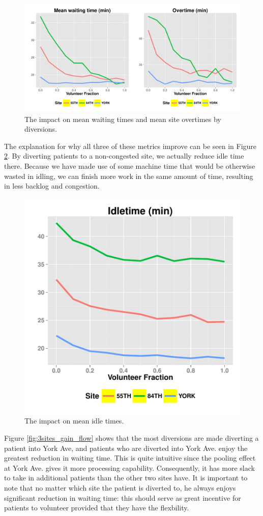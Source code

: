 \begin{figure}[htp]
\centering
\includegraphics[width=.95\textwidth]{chap3/numeric/pic/3sites_wait_over}
\caption{The impact on mean waiting times and mean site overtimes by diversions.}
\label{fig:3sites_wait_over}
\end{figure}

The explanation for why all three of these metrics improve
can be seen in Figure \ref{fig:3sites_idle}. By
diverting patients to a non-congested site, we actually reduce
idle time there. Because we have made use of some machine time that
would be otherwise wasted in idling, we can finish more work
in the same amount of time, resulting in less backlog and congestion.

\begin{figure}[htp]
\centering
\includegraphics[width=.6\textwidth]{chap3/numeric/pic/3sites_idle}
\caption{The impact on mean idle times.}
\label{fig:3sites_idle}
\end{figure}

Figure \ref{fig:3sites_gain_flow} shows that the most diversions are
made diverting a patient into York Ave, and patients who are diverted into York Ave.
enjoy the greatest reduction in waiting time. This is quite intuitive since
the pooling effect at York Ave. gives it more processing capability.
Consequently, it has more slack to take in additional patients than the other two
sites have. It is important to note that no matter which site the patient is diverted to,
he always enjoys significant reduction in waiting time: this
should serve as great incentive for patients to volunteer provided that they
have the flexbility.

